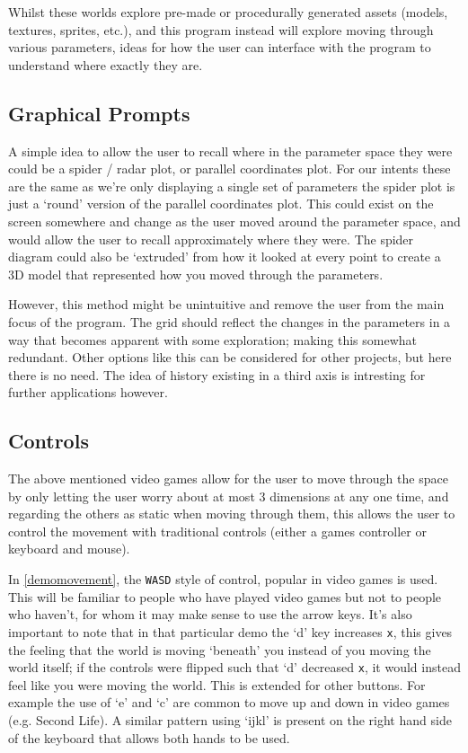 Whilst these worlds explore pre-made or procedurally generated assets (models,
textures, sprites, etc.), and this program instead will explore moving through
various parameters, ideas for how the user can interface with the program to
understand where exactly they are.

\subsection{Graphical Prompts}
A simple idea to allow the user to recall where in the parameter space they were
could be a spider / radar plot, or parallel coordinates plot. For our intents these
are the same as we're only displaying a single set of parameters the spider plot
is just a `round' version of the parallel coordinates plot. This could exist on
the screen somewhere and change as the user moved around the parameter space,
and would allow the user to recall approximately where they were. The spider
diagram could also be `extruded' from how it looked at every point to create a
3D model that represented how you moved through the parameters.

However, this method might be unintuitive and remove the user from the main
focus of the program. The grid should reflect the changes in the parameters in a
way that becomes apparent with some exploration; making this somewhat redundant.
Other options like this can be considered for other projects, but here there is
no need. The idea of history existing in a third axis is intresting for further
applications however. 

\subsection{Controls}
The above mentioned video games allow for the user to move through the space by
only letting the user worry about at most 3 dimensions at any one time, and
regarding the others as static when moving through them, this allows the user to
control the movement with traditional controls (either a games controller or
keyboard and mouse).

In \autoref{demomovement}, the \verb|WASD| style of control, popular in video
games is used. This will be familiar to people who have played video games but
not to people who haven't, for whom it may make sense to use the arrow keys.
It's also important to note that in that particular demo the `d' key increases
\verb|x|, this gives the feeling that the world is moving `beneath' you instead
of you moving the world itself; if the controls were flipped such that `d'
decreased \verb|x|, it would instead feel like you were moving the world. This
is extended for other buttons. For example the use of `e' and `c' are common to
move up and down in video games (e.g. Second Life). A similar pattern using
`ijkl' is present on the right hand side of the keyboard that allows both hands
to be used.

